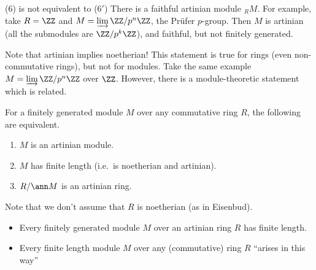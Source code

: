  \begin{remark}
   ($6$) is not equivalent to ($6'$) There is a faithful artinian module ${}_R M$. For
   example, take $R=\ZZ$ and $M = \varinjlim \ZZ/p^n\ZZ$, the Pr\"ufer $p$-group. Then
   $M$ is artinian (all the submodules are $\ZZ/p^k\ZZ$), and faithful, but not finitely
   generated.
 \end{remark}
 \begin{remark}
   Note that artinian implies noetherian! This statement is true for rings (even
   non-commutative rings), but not for modules. Take the same example $M = \varinjlim
   \ZZ/p^n\ZZ$ over $\ZZ$. However, there is a module-theoretic statement which is
   related.
 \end{remark}
 \begin{corollary}
   For a finitely generated module $M$ over any commutative ring $R$, the following are
   equivalent.
   \begin{enumerate}
     \item $M$ is an artinian module.
     \item $M$ has finite length (i.e.\ is noetherian and artinian).
     \item $R/\ann M$ is an artinian ring.
   \end{enumerate}
 \end{corollary}
 Note that we don't assume that $R$ is noetherian (as in Eisenbud).
 \setcounter{lecture}{9}

 \begin{itemize}
   \item Every finitely generated module $M$ over an artinian ring $R$ has finite length.
   \item Every finite length module $M$ over any (commutative) ring $R$ ``arises in this
   way''
 \end{itemize}

